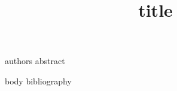 \documentclass[{{classOptions}}]{{{className}}}
\begin{document}
\title{ {{title}} }
{{authors}}
{{abstract}}
\let\stratummaketitle\maketitle
\maketitle
\renewcommand{\maketitle}{\let\maketitle\stratummaketitle}
{{body}}
{{bibliography}}
\end{document}
